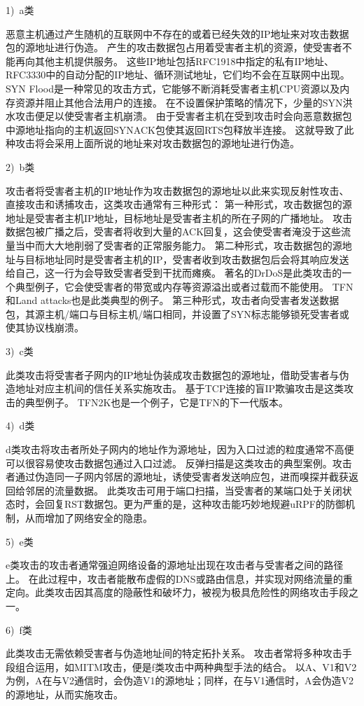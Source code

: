 1)~a类\par
恶意主机通过产生随机的互联网中不存在的或着已经失效的IP地址来对攻击数据包的源地址进行伪造。
产生的攻击数据包占用着受害者主机的资源，使受害者不能再向其他主机提供服务。
这些IP地址包括RFC1918中指定的私有IP地址、RFC3330中的自动分配的IP地址、循环测试地址，它们均不会在互联网中出现。
SYN Flood\cite{rahouti2021synguard,dimolianis2021syn}是一种常见的攻击方式，它能够不断消耗受害者主机CPU资源以及内存资源并阻止其他合法用户的连接。
在不设置保护策略的情况下，少量的SYN洪水攻击便足以使受害者主机崩溃。
由于受害者主机在受到攻击时会向恶意数据包中源地址指向的主机返回SYNACK包使其返回RTS包释放半连接。
这就导致了此种攻击将会采用上面所说的地址来对攻击数据包的源地址进行伪造。\par
2)~b类\par
攻击者将受害者主机的IP地址作为攻击数据包的源地址以此来实现反射性攻击、直接攻击和诱捕攻击，这类攻击通常有三种形式：
第一种形式，攻击数据包的源地址是受害者主机IP地址，目标地址是受害者主机的所在子网的广播地址。
攻击数据包被广播之后，受害者将收到大量的ACK回复，这会使受害者淹没于这些流量当中而大大地削弱了受害者的正常服务能力。
第二种形式，攻击数据包的源地址与目标地址同时是受害者主机的IP，受害者收到攻击数据包后会将其响应发送给自己，这一行为会导致受害者受到干扰而瘫痪。
著名的DrDoS\cite{baik2020multi,nuiaa2022comprehensive}是此类攻击的一个典型例子，它会使受害者的带宽或内存等资源溢出或者过载而不能使用。
TFN\cite{brooks2021distributed}和Land  attacks\cite{CERT1997}也是此类典型的例子。
第三种形式，攻击者向受害者发送数据包，其源主机/端口与目标主机/端口相同，并设置了SYN标志能够锁死受害者或使其协议栈崩溃。\par
3)~c类\par
此类攻击将受害者子网内的IP地址伪装成攻击数据包的源地址，借助受害者与伪造地址对应主机间的信任关系实施攻击。
基于TCP连接的盲IP欺骗攻击\cite{fonseca2021identifying}是这类攻击的典型例子。
TFN2K\cite{singh2020study}也是一个例子，它是TFN的下一代版本。\par
4)~d类\par
d类攻击将攻击者所处子网内的地址作为源地址，因为入口过滤的粒度通常不高便可以很容易使攻击数据包通过入口过滤。
反弹扫描\cite{CERT1997}是这类攻击的典型案例。攻击者通过伪造同一子网内邻居的源地址，诱使受害者发送响应包，进而嗅探并截获返回给邻居的流量数据。
此类攻击可用于端口扫描，当受害者的某端口处于关闭状态时，会回复RST数据包\cite{kaur2023comparative}。更为严重的是，这种攻击能巧妙地规避uRPF\cite{dhilipan2023detection}的防御机制，从而增加了网络安全的隐患。\par
5)~e类\par
e类攻击的攻击者通常强迫网络设备的源地址出现在攻击者与受害者之间的路径上。
在此过程中，攻击者能散布虚假的DNS或路由信息，并实现对网络流量的重定向\cite{Huang2006}。此类攻击因其高度的隐蔽性和破坏力，被视为极具危险性的网络攻击手段之一。\par
6)~f类\par
此类攻击无需依赖受害者与伪造地址间的特定拓扑关系。
攻击者常将多种攻击手段组合运用，如MITM攻击\cite{schrottenloher2023simplified}，便是f类攻击中两种典型手法的结合。
以A、V1和V2为例，A在与V2通信时，会伪造V1的源地址；同样，在与V1通信时，A会伪造V2的源地址，从而实施攻击。\par

